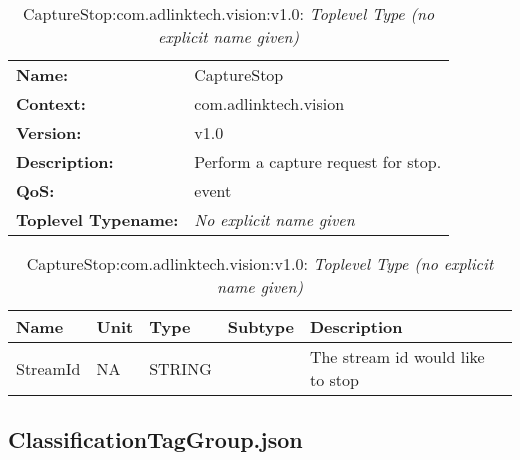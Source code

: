 \begin{table}[H]
\begin{tabularx}{\textwidth}{l X} 
       \textbf{Name:} & CaptureStop \\ 
	   \textbf{Context:} & com.adlinktech.vision \\ 
	   \textbf{Version:} & v1.0 \\ 
	   \textbf{Description:} & Perform a capture request for stop. \\ 
	   \textbf{QoS:} & event \\
	   \textbf{Toplevel Typename:} & \textit{No explicit name given} \\ 
\end{tabularx}
\caption{CaptureStop:com.adlinktech.vision:v1.0}\label{CaptureStopTagGroup.json:table:CaptureStop}
\bigskip
\begin{tabularx}{\textwidth}{l l l l X} 
	 \textbf{Name} & \textbf{Unit} & \textbf{Type} & \textbf{Subtype} & \textbf{Description} \\
	 \midrule
   StreamId & NA & STRING &  & The stream id would like to stop \\
\end{tabularx}
\caption{CaptureStop:com.adlinktech.vision:v1.0: \textit{Toplevel Type (no explicit name given)}}\label{CaptureStopTagGroup.json:table:CaptureStop-no-type-given}


\end{table}

\subsection{ClassificationTagGroup.json}

